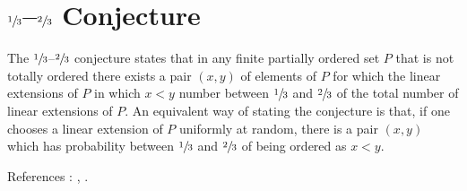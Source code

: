 \section{$\sfrac{1}{3}$--$\sfrac{2}{3}$ Conjecture}

The $\sfrac{1}{3}$--$\sfrac{2}{3}$ conjecture states that in any finite partially ordered set $P$ that is not totally ordered there exists a pair $(x,y)$ of elements of $P$ for which the linear extensions of $P$ in which $x < y$ number between $\sfrac{1}{3}$ and $\sfrac{2}{3}$ of the total number of linear extensions of $P$. An equivalent way of stating the conjecture is that, if one chooses a linear extension of $P$ uniformly at random, there is a pair $(x,y)$ which has probability between $\sfrac{1}{3}$ and $\sfrac{2}{3}$ of being ordered as $x < y$.


References : \cite{kral2013new}, \cite{zaguia20111}.